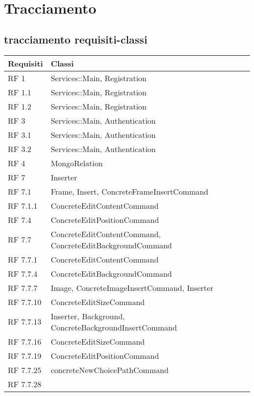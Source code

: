 \section{Tracciamento}
\subsection{tracciamento requisiti-classi}

\begin{center}
\bgroup
\def\arraystretch{1.5}
\begin{longtable}{ | p{2cm} | p{12cm} | }
\hline
\cellcolor[gray]{0.9} \textbf{Requisiti} & \cellcolor[gray]{0.9} \textbf{Classi}
 \\ \hline
RF 1 & Services::Main, Registration\\ 
 \hline 
RF 1.1 & Services::Main, Registration\\ 
 \hline 
RF 1.2 & Services::Main, Registration\\ 
 \hline 
RF 3 & Services::Main, Authentication\\ 
 \hline 
RF 3.1 & Services::Main, Authentication\\ 
 \hline 
RF 3.2 & Services::Main, Authentication\\ 
 \hline 
RF 4 & MongoRelation\\ 
 \hline 
RF 7 & Inserter\\ 
 \hline 
RF 7.1 & Frame, Insert, ConcreteFrameInsertCommand\\ 
 \hline 
RF 7.1.1 & ConcreteEditContentCommand\\ 
 \hline 
RF 7.4 & ConcreteEditPositionCommand\\ 
 \hline 
RF 7.7 & ConcreteEditContentCommand, ConcreteEditBackgroundCommand\\ 
 \hline 
RF 7.7.1 & ConcreteEditContentCommand\\ 
 \hline 
RF 7.7.4 & ConcreteEditBackgroundCommand\\ 
 \hline 
RF 7.7.7 & Image, ConcreteImageInsertCommand, Inserter\\ 
 \hline 
RF 7.7.10 & ConcreteEditSizeCommand\\ 
 \hline 
RF 7.7.13 & Inserter, Background, ConcreteBackgroundInsertCommand\\ 
 \hline 
RF 7.7.16 & ConcreteEditSizeCommand\\ 
 \hline 
RF 7.7.19 & ConcreteEditPositionCommand\\ 
 \hline 
RF 7.7.25 & concreteNewChoicePathCommand\\ 
 \hline 
RF 7.7.28 & \\ 

\end{longtable}
\end{center}
